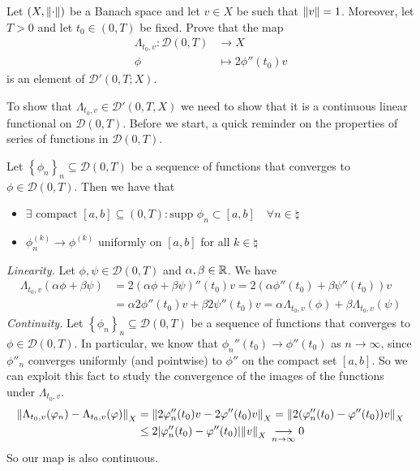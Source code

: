 \newpage
\begin{exercise}
    Let \((X, \norm{\cdot})\) be a Banach space and let \(v \in X\) be such that \(\norm{v} = 1\). Moreover, let \(T > 0\) and let \(t_0 \in (0, T)\) be fixed. Prove that the map
    \begin{align*}
        \Lambda_{t_0, v}: \mathcal{D}(0, T) & \longrightarrow X           \\
        \phi                                & \longmapsto 2 \phi''(t_0) v
    \end{align*}
    is an element of \(\mathcal{D}'(0, T; X)\).
\end{exercise}
To show that \(\Lambda_{t_0, v} \in \mathcal{D}'(0, T, X)\) we need to show that it is a continuous linear functional on \(\mathcal{D}(0, T)\).
Before we start, a quick reminder on the properties of series of functions in \(\mathcal{D}(0, T)\).
\begin{remark}
    Let \(\left\{ \phi_n \right\}_{n} \subseteq \mathcal{D}(0, T)\) be a sequence of functions that converges to \(\phi \in \mathcal{D}(0, T)\). Then we have that
    \begin{itemize}
        \item \(\exists \text{ compact }[a, b] \subseteq (0, T) \colon \text{supp } \phi_n \subset [a, b] \quad \forall n \in \natural\)
        \item \(\phi_n^{(k)} \to \phi^{(k)}\) uniformly on \([a, b]\) for all \(k \in \natural\)
    \end{itemize}
\end{remark}
\textit{Linearity.}
Let \(\phi, \psi \in \mathcal{D}(0, T)\) and \(\alpha, \beta \in \mathbb{R}\). We have
\[
    \begin{split}
        \Lambda_{t_0, v}(\alpha \phi + \beta \psi) & = 2 (\alpha \phi + \beta \psi)''(t_0) v = 2 (\alpha \phi''(t_0) + \beta \psi''(t_0)) v                          \\
                                                   & = \alpha 2 \phi''(t_0) v + \beta 2 \psi''(t_0) v = \alpha \Lambda_{t_0, v}(\phi) + \beta \Lambda_{t_0, v}(\psi)
    \end{split}
\]
\textit{Continuity.}
Let \(\left\{\phi_n\right\}_n \subseteq \mathcal{D}(0, T)\) be a sequence of functions that converges to \(\phi \in \mathcal{D}(0, T)\).
In particular, we know that \(\phi_n''(t_0) \to \phi''(t_0)\) as \(n \to \infty\), since \(\phi''_n\) converges uniformly (and pointwise) to \(\phi''\) on the compact set \([a, b]\).
So we can exploit this fact to study the convergence of the images of the functions under \(\Lambda_{t_0, v}\).
\[
    \begin{split}
        \norm{\Lambda_{t_0, v}(\varphi_n) - \Lambda_{t_0, v}(\varphi)}_X & = \norm{2 \varphi_n''(t_0) v - 2 \varphi''(t_0) v}_X = \norm{2 (\varphi_n''(t_0) - \varphi''(t_0)) v}_X      \\
                                                                   & \leq 2 \abs{\varphi_n''(t_0) - \varphi''(t_0)} \norm{v}_X\, \underset{n \to \infty}{\longrightarrow} 0
    \end{split}
\]
So our map is also continuous.